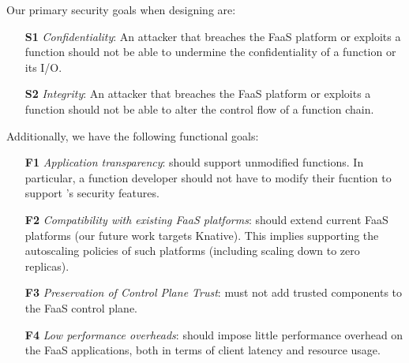 %
%
Our primary security goals when designing \SystemName are:
%
\begin{itemize}
    \item[\textbf{S1}] \emph{Confidentiality}: 
        An attacker that breaches the FaaS platform or exploits a function
        should not be able to undermine the confidentiality of a function or
        its I/O\@.
    \item[\textbf{S2}] \emph{Integrity}:
        An attacker that breaches the FaaS platform or exploits a function
        should not be able to alter the control flow of a function chain.
\end{itemize}
%
Additionally, we have the following functional goals:
%
\begin{itemize}
    \item[\textbf{F1}] \emph{Application transparency}: \SystemName should
        support unmodified functions.
        In particular, a function developer should not have to modify their
        fucntion to support \SystemName's security features.
    \item[\textbf{F2}] \emph{Compatibility with existing FaaS platforms}:
        \SystemName should extend current FaaS platforms (our future work
        targets Knative).
        This implies supporting the autoscaling policies of such platforms
        (including scaling down to zero replicas).
    \item[\textbf{F3}] \emph{Preservation of Control Plane Trust}:
        \SystemName must not add trusted components to the FaaS control plane.
    \item[\textbf{F4}] \emph{Low performance overheads}:
        \SystemName should impose little performance overhead on the
        FaaS applications, both in terms of client latency and
        resource usage.
\end{itemize}
